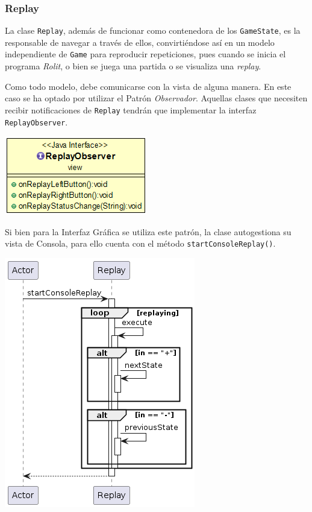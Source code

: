 \documentclass[../DocumentoOficial.tex]{subfiles}
\begin{document}
\subsubsection{Replay}
La clase \texttt{Replay}, además de funcionar como contenedora de los \texttt{GameState}, es la responsable de navegar a través de ellos, convirtiéndose así en un modelo independiente de \texttt{Game} para reproducir repeticiones, pues cuando se inicia el programa \textit{Rolit}, o bien se juega una partida o se visualiza una \textit{replay}.

Como todo modelo, debe comunicarse con la vista de alguna manera. En este caso se ha optado por utilizar el Patrón \textit{Observador}. Aquellas clases que necesiten recibir notificaciones de \texttt{Replay} tendrán que implementar la interfaz \texttt{ReplayObserver}.

\begin{center}
\includegraphics[scale=0.5]{rolit-observer-sprint4.png}
\end{center}


Si bien para la Interfaz Gráfica se utiliza este patrón, la clase autogestiona su vista de Consola, para ello cuenta con el método \texttt{startConsoleReplay()}.

\begin{center}
\includegraphics[scale=0.7]{vistareplay.png}
\end{center}
\end{document}
